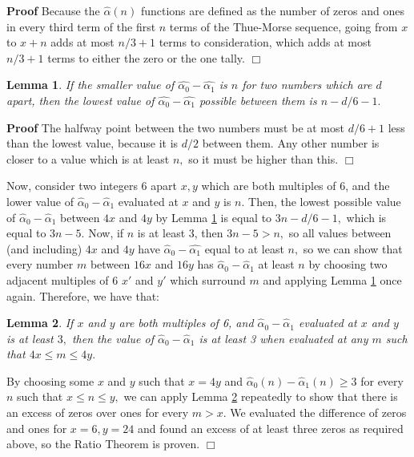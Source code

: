 \documentclass{article}
\newtheorem{lemma}{Lemma}[section]
\begin{document}
\textbf{Proof} Because the $\hat{\alpha}(n)$ functions are defined as the number of zeros and ones in every third term of the first $n$ terms of the Thue-Morse sequence, going from $x$ to $x+n$ adds at most $n/3 + 1$ terms to consideration, which adds at most $n/3 + 1$ terms to either the zero or the one tally. $\Box$

\begin{lemma}
\label{dip}
If the smaller value of $\hat{\alpha_0} - \hat{\alpha_1}$ is $n$ for two numbers which are $d$ apart, then the lowest value of $\hat{\alpha_0} - \hat{\alpha_1}$ possible between them is $n - d/6 - 1.$
\end{lemma}

\textbf{Proof} The halfway point between the two numbers must be at most $d/6 + 1$ less than the lowest value, because it is $d/2$ between them. Any other number is closer to a value which is at least $n,$ so it must be higher than this. $\Box$

Now, consider two integers 6 apart $x, y$ which are both multiples of 6, and the lower value of $\hat{\alpha}_0 - \hat{\alpha}_1$ evaluated at $x$ and $y$ is $n.$ Then, the lowest possible value of $\hat{\alpha}_0 - \hat{\alpha}_1$ between $4x$ and $4y$ by Lemma \ref{dip} is equal to $3n - d/6 - 1,$ which is equal to $3n - 5.$ Now, if $n$ is at least 3, then $3n - 5 > n,$ so all values between (and including) $4x$ and $4y$ have $\hat{\alpha}_0 - \hat{\alpha_1}$ equal to at least $n,$ so we can show that every number $m$ between $16x$ and $16y$ has $\hat{\alpha}_0 - \hat{\alpha}_1$ at least $n$ by choosing two adjacent multiples of 6 $x'$ and $y'$ which surround $m$ and applying Lemma \ref{dip} once again. Therefore, we have that:

\begin{lemma}
\label{stretch}
If $x$ and $y$ are both multiples of 6, and $\hat{\alpha}_0 - \hat{\alpha}_1$ evaluated at $x$ and $y$ is at least $3,$ then the value of $\hat{\alpha}_0 - \hat{\alpha}_1$ is at least 3 when evaluated at any $m$ such that $4x \leq m \leq 4y.$
\end{lemma}

By choosing some $x$ and $y$ such that $x = 4y$ and $\hat{\alpha}_0(n) - \hat{\alpha}_1(n) \geq 3$ for every $n$ such that $x \leq n \leq y,$ we can apply Lemma \ref{stretch} repeatedly to show that there is an excess of zeros over ones for every $m > x.$ We evaluated the difference of zeros and ones for $x = 6, y = 24$ and found an excess of at least three zeros as required above, so the Ratio Theorem is proven. $\Box$
\end{document}
